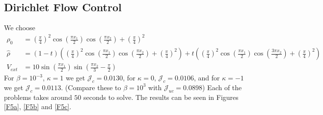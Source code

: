 \documentclass[11pt, a4paper]{article}
\theoremstyle{definition}
\newcommand{\hr}{\widehat \rho}
\begin{document}
	\subsection{Dirichlet Flow Control}
	We choose
	\begin{align*}
		\rho_0 &= \left(\frac{\pi}{4}\right)^2\cos\left(\frac{\pi x_1}{2}\right)\cos\left(\frac{\pi x_2}{2}\right) + \left(\frac{\pi}{4}\right)^2\\
		\hr &= (1 - t)\left(\left(\frac{\pi}{4}\right)^2\cos\left(\frac{\pi x_1}{2}\right)\cos\left(\frac{\pi x_2}{2}\right) + \left(\frac{\pi}{4}\right)^2\right) + t\left(\left(\frac{\pi}{4}\right)^2\cos\left(\frac{\pi x_1}{2}\right)\cos\left(\frac{3\pi x_2}{2}\right) + \left(\frac{\pi}{4}\right)^2\right)\\
		V_{ext} &= 10\sin\left(\frac{\pi x_1}{2}\right) \sin\left(\frac{\pi x_2}{3} - \frac{\pi}{2}\right)
	\end{align*}
	For $\beta = 10^{-3}$, $\kappa = 1$ we get $\mathcal J_c = 0.0130$, for $\kappa = 0$, $\mathcal J_c = 0.0106$, and for $\kappa = - 1$ we get $\mathcal J_c = 0.0113$. (Compare these to $\beta = 10^3$ with $\mathcal J_{uc} = 0.0898$) Each of the problems takes around $50$ seconds to solve. The results can be seen in Figures \ref{F5a}, \ref{F5b} and \ref{F5c}.
	
\end{document}
